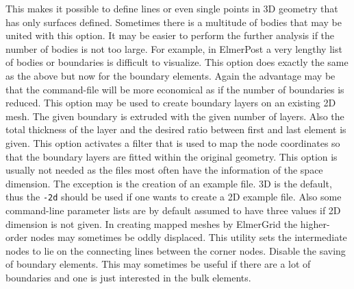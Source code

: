 This makes it possible to define lines or even single points 
in 3D geometry that has only surfaces defined.
%
Sometimes there is a multitude of bodies that may be united with this option.
It may be easier to perform the further analysis if the number of bodies 
is not too large.
For example, in ElmerPost a very lengthy list of bodies or 
boundaries is difficult to visualize. 
%
This option does exactly the same as the above but now for the boundary
 elements.
Again the advantage may be that the command-file will be more economical as 
if the number of boundaries is reduced.
%
This option may be used to create boundary layers on an existing 2D mesh.
The given boundary is extruded with the given number of layers. Also the total
thickness of the layer and the desired ratio between first and last element
is given.
%
This option activates a filter that is used to map the node coordinates 
so that the boundary layers are fitted within the original geometry.
%
This option is usually not needed as the files most often have the information
of the space dimension. The exception is the creation of an example file.
3D is the default, thus the \texttt{-2d} should be used if one wants to create
a 2D example file. Also some command-line parameter lists are by default assumed to have 
three values if 2D dimension is not given.
%
In creating mapped meshes by ElmerGrid the higher-order nodes may sometimes be 
oddly displaced. This utility sets the intermediate nodes to lie on the connecting lines
between the corner nodes. 
%
Disable the saving of boundary elements.
This may sometimes be useful if there are a lot of boundaries and one is just interested 
in the bulk elements.

\sifend



